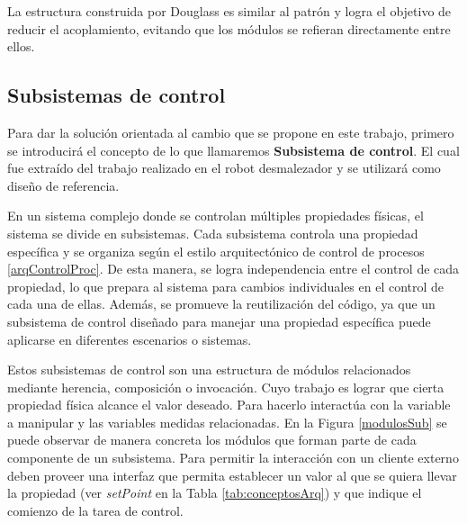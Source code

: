 La estructura construida por Douglass es similar al patrón y logra el objetivo de reducir el acoplamiento, evitando que los módulos se refieran directamente entre ellos.



\subsection*{Subsistemas de control}
\label{subsistema}

Para dar la solución orientada al cambio que se propone en este trabajo, primero se introducirá el concepto de lo que llamaremos \textbf{Subsistema de control}. El cual fue extraído del trabajo realizado en el robot desmalezador \citep{paperPomponio} y se utilizará como diseño de referencia.

En un sistema complejo donde se controlan múltiples propiedades físicas, el sistema se divide en subsistemas. Cada subsistema controla una propiedad específica y se organiza según el estilo arquitectónico de control de procesos \ref{arqControlProc}. De esta manera, se logra independencia entre el control de cada propiedad, lo que prepara al sistema para cambios individuales en el control de cada una de ellas. Además, se promueve la reutilización del código, ya que un subsistema de control diseñado para manejar una propiedad específica puede aplicarse en diferentes escenarios o sistemas.

Estos subsistemas de control son una estructura de módulos relacionados mediante herencia, composición o invocación. Cuyo trabajo es lograr que cierta propiedad física alcance el valor deseado. Para hacerlo interactúa con la variable a manipular y las variables medidas relacionadas. En la Figura \ref{modulosSub} se puede observar de manera concreta los módulos que forman parte de cada componente de un subsistema. Para permitir la interacción con un cliente externo deben proveer una interfaz que permita establecer un valor al que se quiera llevar la propiedad (ver \textit{setPoint} en la Tabla \ref{tab:conceptosArq}) y que indique el comienzo de la tarea de control.

